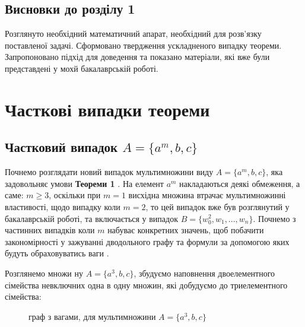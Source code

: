 \section*{Висновки до розділу 1}

	Розглянуто необхідний математичний апарат, необхідний для розв'язку поставленої задачі. Сформовано твердження ускладненого випадку теореми. Запропоновано підхід для доведення та показано матеріали, які вже були представдені у мохй бакалаврській роботі.
	
	
\newpage

\chapter{Часткові випадки теореми}
\section{Частковий випадок $A = \{a^m, b, c\}$}

Почнемо розглядати новий випадок мультимножини виду $A = \{a^m, b, c\}$, яка задовольняє умови {\bf Теореми 1} \cite{my_article:2021}. На елемент $a^m$ накладаються деякі обмеження, а саме: $m \geq 3 $, оскільки при $ m = 1 $ висхідна множина втрачає мультимножинні властивості, щодо випадку коли  $ m = 2 $, то цей випадок вже був розглянутий у бакалаврській роботі, та включається у випадок $B = \{w_0^{2}, w_1,...,w_n\}$. Почнемо з частинних випадків коли  $ m $ набуває конкретних значень, щоб побачити закономірності у зажуванні дводольного графу та формули за допомогою яких будуть обраховуватись ваги \cite{my_article:2021}.

\begin{example}

Розглянемо множи ну $ A = \{a^3, b, c\} $, збудуємо наповнення двоелементного сімейства невключних одна в одну множин, які добудуємо до триелементного сімейства:
\begin{figure}
\begin{center}
\end{center}
\caption{граф з вагами, для мультимножини $ A = \{a^3, b, c\}$}
\end{figure}

\end{example}

